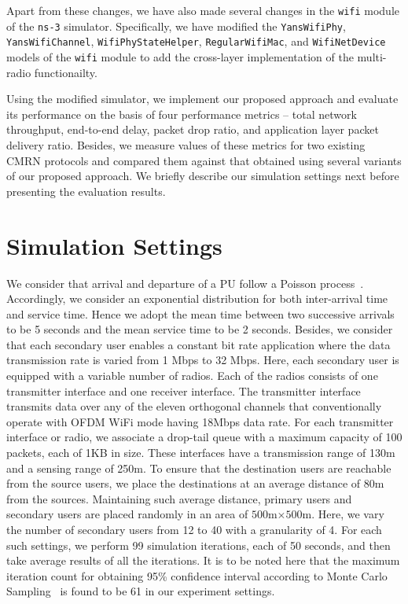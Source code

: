 Apart from these changes, we have also made several changes in the \texttt{wifi} module of the \texttt{ns-3} simulator. Specifically, we have modified the \texttt{YansWifiPhy}, \texttt{YansWifiChannel}, \texttt{WifiPhyStateHelper}, \texttt{RegularWifiMac}, and \texttt{WifiNetDevice} models of the \texttt{wifi} module to add the cross-layer implementation of the multi-radio functionailty.

Using the modified simulator, we implement our proposed approach and evaluate its performance on the basis of four performance metrics -- total network throughput, end-to-end delay, packet drop ratio, and application layer packet delivery ratio. Besides, we measure values of these metrics for two existing CMRN protocols and compared them against that obtained using several variants of our proposed approach. We briefly describe our simulation settings next before presenting the evaluation results.

\section{Simulation Settings}

We consider that arrival and departure of a PU follow a Poisson process~\cite{heo2008mathematical}. Accordingly, we consider an exponential distribution for both inter-arrival time and service time. Hence we adopt the mean time between two successive arrivals to be 5 seconds and the mean service time to be 2 seconds. Besides, we consider that each secondary user enables a constant bit rate application where the data transmission rate is varied from 1 Mbps to 32 Mbps. Here, each secondary user is equipped with a variable number of radios. Each of the radios consists of one transmitter interface and one receiver interface. The transmitter interface transmits data over any of the eleven orthogonal channels that conventionally operate with OFDM WiFi mode having 18Mbps data rate. For each transmitter interface or radio, we associate a drop-tail queue with a maximum capacity of 100 packets, each of 1KB in size. These interfaces have a transmission range of 130m and a sensing range of 250m. To ensure that the destination users are reachable from the source users, we place the destinations at an average distance of 80m from the sources. Maintaining such average distance, primary users and secondary users are placed randomly in an area of $500$m$\times 500$m. Here, we vary the number of secondary users from 12 to 40 with a granularity of 4. For each such settings, we perform 99 simulation iterations, each of 50 seconds, and then take average results of all the iterations. It is to be noted here that the maximum iteration count for obtaining 95\% confidence interval according to Monte Carlo Sampling~\cite{winston2000simulation} is found to be 61 in our experiment settings. 

